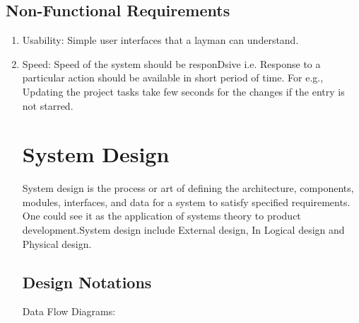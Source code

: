 \documentclass[12pt]{article}
\begin{document}
\subsection{Non-Functional Requirements}
\begin{enumerate}
\item Usability: Simple user interfaces that a layman can understand.
\item  Speed: Speed of the system should be responDsive i.e. Response to a particular action should
be available in short period of time. For e.g., Updating the project tasks take few seconds
for the changes if the entry is not starred.


\section{System Design}
System design is the process or art of defining the architecture, components, modules, interfaces,
and data for a system to satisfy specified requirements. One could see it as the application of
systems theory to product development.System design include External design, In Logical design and Physical design.\\
\subsection{Design Notations}
Data Flow Diagrams:


\end{enumerate}
\end{document}
